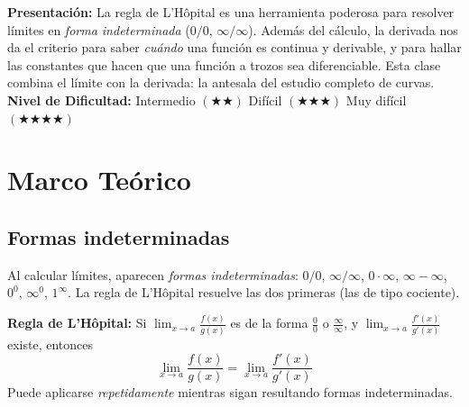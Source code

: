 \documentclass[12pt, letterpaper]{article}
\begin{document}


\vspace{4pt}
\begin{cuadroinfo}
  \small
  \textbf{Presentación:} La regla de L'Hôpital es una herramienta poderosa para resolver límites en \emph{forma indeterminada} ($0/0$, $\infty/\infty$). Además del cálculo, la derivada nos da el criterio para saber \emph{cuándo} una función es continua y derivable, y para hallar las constantes que hacen que una función a trozos sea diferenciable. Esta clase combina el límite con la derivada: la antesala del estudio completo de curvas.
  \\[6pt]
  \textbf{Nivel de Dificultad:}\quad
  \medio{} Intermedio $(\bigstar\bigstar)$ \quad
  \dificil{} Difícil $(\bigstar\bigstar\bigstar)$ \quad
  \muyDificil{} Muy difícil $(\bigstar\bigstar\bigstar\bigstar)$
\end{cuadroinfo}

\vspace{8pt}

\section{Marco Teórico}

\subsection{Formas indeterminadas}

Al calcular límites, aparecen \emph{formas indeterminadas}: $0/0$, $\infty/\infty$, $0\cdot\infty$, $\infty - \infty$, $0^0$, $\infty^0$, $1^\infty$. La regla de L'Hôpital resuelve las dos primeras (las de tipo cociente).

\begin{cuadroteoria}
  \textbf{Regla de L'Hôpital:} Si $\lim_{x\to a} \frac{f(x)}{g(x)}$ es de la forma $\frac{0}{0}$ o $\frac{\infty}{\infty}$, y $\lim_{x\to a}\frac{f'(x)}{g'(x)}$ existe, entonces
  \[
    \lim_{x\to a}\frac{f(x)}{g(x)} = \lim_{x\to a}\frac{f'(x)}{g'(x)}
  \]
  Puede aplicarse \emph{repetidamente} mientras sigan resultando formas indeterminadas.
\end{cuadroteoria}
\end{document}
